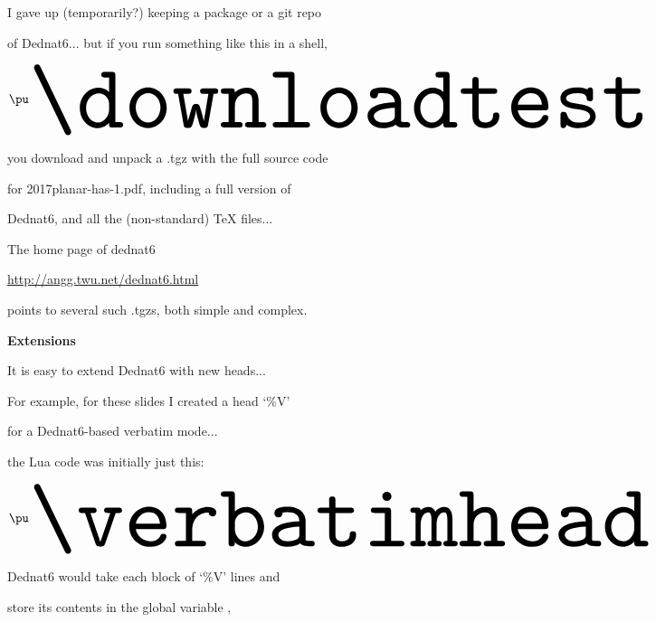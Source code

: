 \documentclass[oneside]{book}
\begin{document}
I gave up (temporarily?) keeping a package or a git repo

of Dednat6... but if you run something like this in a shell,


%

$\pu
  \myvcenter{\resizebox{!}{50pt}{\downloadtest}}
$

you download and unpack a .tgz with the full source code

for {2017planar-has-1.pdf}, including a full version of

Dednat6, and all the (non-standard) \TeX{} files...

The home page of dednat6

\url{http://angg.twu.net/dednat6.html}

points to several such .tgzs, both simple and complex.


\newpage

%                                                 

{\bf Extensions}

It is easy to extend Dednat6 with new heads...

For example, for these slides I created a head `{\%V}'

for a Dednat6-based verbatim mode...

the Lua code was initially just this:

%
$\pu
  \myvcenter{\resizebox{!}{50pt}{\verbatimhead}}
$

Dednat6 would take each block of `{\%V}' lines and

store its contents in the global variable {},
\end{document}
